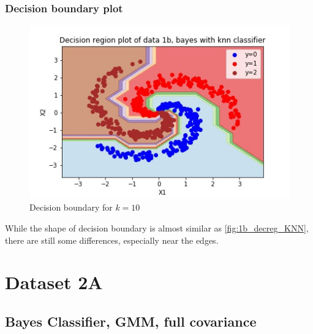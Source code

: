 \documentclass[11pt,a4paper]{article}
\begin{document}
\subsubsection{Decision boundary plot}
\begin{figure}[H]
    \centering
    \includegraphics[scale=1]{images/1b_nb_decision_region.jpg}
    \caption{Decision boundary for $k=10$}
    \label{fig:1b_decreg_nb}
\end{figure}
While the shape of decision boundary is almost similar as \autoref{fig:1b_decreg_KNN}, there are still some differences, especially near the edges.

\break
\section{Dataset 2A}
\subsection{Bayes Classifier, GMM, full covariance}
\end{document}
